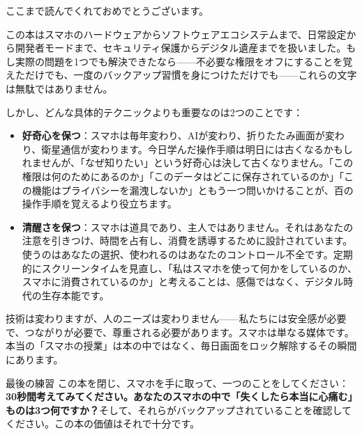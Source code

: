 
ここまで読んでくれておめでとうございます。

この本はスマホのハードウェアからソフトウェアエコシステムまで、日常設定から開発者モードまで、セキュリティ保護からデジタル遺産までを扱いました。もし実際の問題を1つでも解決できたなら——不必要な権限をオフにすることを覚えただけでも、一度のバックアップ習慣を身につけただけでも——これらの文字は無駄ではありません。

しかし、どんな具体的テクニックよりも重要なのは2つのことです：

\begin{itemize}
  \item \textbf{好奇心を保つ}：スマホは毎年変わり、AIが変わり、折りたたみ画面が変わり、衛星通信が変わります。今日学んだ操作手順は明日には古くなるかもしれませんが、「なぜ知りたい」という好奇心は決して古くなりません。「この権限は何のためにあるのか」「このデータはどこに保存されているのか」「この機能はプライバシーを漏洩しないか」ともう一つ問いかけることが、百の操作手順を覚えるより役立ちます。
  \item \textbf{清醒さを保つ}：スマホは道具であり、主人ではありません。それはあなたの注意を引きつけ、時間を占有し、消費を誘導するために設計されています。使うのはあなたの選択、使われるのはあなたのコントロール不全です。定期的にスクリーンタイムを見直し、「私はスマホを使って何かをしているのか、スマホに消費されているのか」と考えることは、感傷ではなく、デジタル時代の生存本能です。
\end{itemize}

技術は変わりますが、人のニーズは変わりません——私たちには安全感が必要で、つながりが必要で、尊重される必要があります。スマホは単なる媒体です。本当の「スマホの授業」は本の中ではなく、毎日画面をロック解除するその瞬間にあります。

\begin{tcbpractice}{最後の練習}
この本を閉じ、スマホを手に取って、一つのことをしてください：\textbf{30秒間考えてみてください。あなたのスマホの中で「失くしたら本当に心痛む」ものは3つ何ですか？}そして、それらがバックアップされていることを確認してください。この本の価値はそれで十分です。

\end{tcbpractice}
